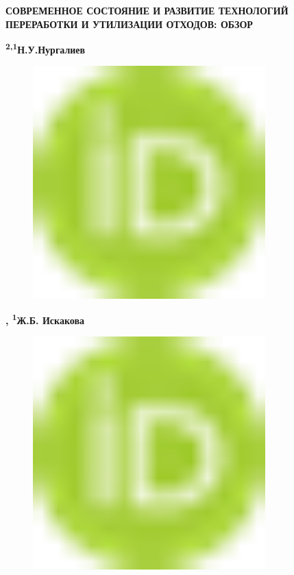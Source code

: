 
{\bfseries СОВРЕМЕННОЕ СОСТОЯНИЕ И РАЗВИТИЕ ТЕХНОЛОГИЙ ПЕРЕРАБОТКИ И
УТИЛИЗАЦИИ ОТХОДОВ: ОБЗОР}

{\bfseries \textsuperscript{2,1}Н.У.Нургалиев}
\begin{figure}[H]
	\centering
	\includegraphics[width=0.8\textwidth]{media/chem2/image1}
	\caption*{}
\end{figure}
{\bfseries \textsuperscript{\envelope },
\textsuperscript{1}Ж.Б.
Искакова}
\begin{figure}[H]
	\centering
	\includegraphics[width=0.8\textwidth]{media/chem2/image1}
	\caption*{}
\end{figure}
